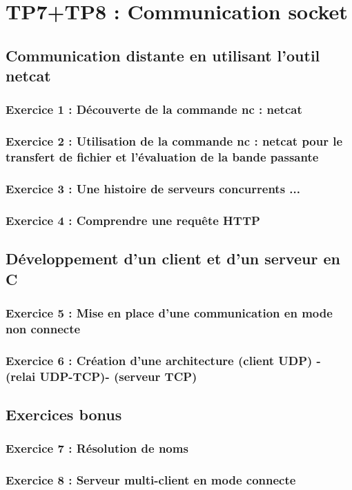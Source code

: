 \chapter{TP7+TP8 : Communication socket}
    \section{Communication distante en utilisant l’outil netcat}
        \subsection{Exercice 1 : Découverte de la commande nc : netcat}
        \subsection{Exercice 2 : Utilisation de la commande nc : netcat pour le transfert de fichier et l’évaluation de
la bande passante}
        \subsection{Exercice 3 : Une histoire de serveurs concurrents ...}
        \subsection{Exercice 4 : Comprendre une requête HTTP}
    \section{Développement d’un client et d’un serveur en C}
        \subsection{Exercice 5 : Mise en place d’une communication en mode non connecte}
        \subsection{Exercice 6 : Création d’une architecture (client UDP) - (relai UDP-TCP)- (serveur TCP)}
    \section{Exercices bonus}
        \subsection{Exercice 7 : Résolution de noms}
        \subsection{Exercice 8 : Serveur multi-client en mode connecte}
